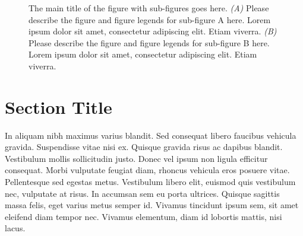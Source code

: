 \documentclass[12pt]{report}
\begin{document}
\begin{figure}[H]
\centering
{}
\hfill
{}
\caption[The main title of the figure with sub-figures goes here.]{The main title of the figure with sub-figures goes here. \textit{(A)} Please describe the figure and figure legends for sub-figure A here. Lorem ipsum dolor sit amet, consectetur adipiscing elit. Etiam viverra. \textit{(B)} Please describe the figure and figure legends for sub-figure B here. Lorem ipsum dolor sit amet, consectetur adipiscing elit. Etiam viverra.}
\label{fig:main_figure}
\end{figure}
    
    


\section{Section Title}
In aliquam nibh maximus \cite{belkin2002using} varius blandit. Sed consequat libero faucibus vehicula gravida. Suspendisse vitae nisi ex. Quisque gravida risus ac dapibus blandit. Vestibulum mollis sollicitudin justo. Donec vel ipsum non ligula efficitur consequat. Morbi vulputate feugiat diam, rhoncus vehicula eros posuere vitae. Pellentesque sed egestas metus. Vestibulum libero elit, euismod quis vestibulum nec, vulputate at risus. In accumsan sem eu porta ultrices. Quisque sagittis massa felis, eget varius metus semper id. Vivamus tincidunt ipsum sem, sit amet eleifend diam tempor nec. Vivamus elementum, diam id lobortis mattis, nisi lacus.
\end{document}
